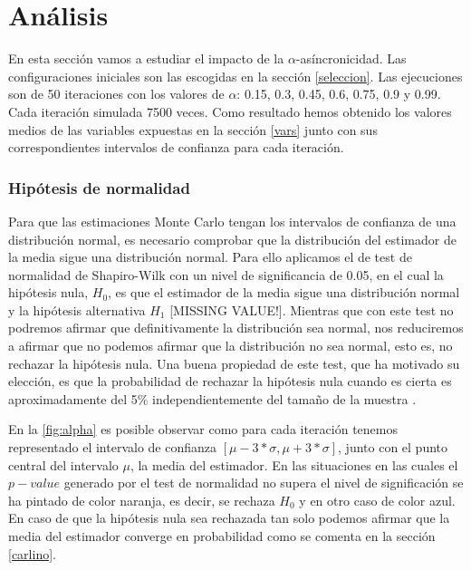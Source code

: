 \documentclass[../proyecto.tex]{memoir}
\begin{document}
\chapter{Análisis}


En esta sección vamos a estudiar el impacto de la $\alpha$-asíncronicidad. Las configuraciones iniciales son las escogidas en la sección \ref{seleccion}. Las ejecuciones son de 50 iteraciones con los valores de $\alpha$: 0.15, 0.3, 0.45, 0.6, 0.75, 0.9 y 0.99. Cada iteración simulada 7500 veces. Como resultado hemos obtenido los valores medios de las variables expuestas en la sección \ref{vars} junto con sus correspondientes intervalos de confianza para cada iteración.

\subsection{Hipótesis de normalidad} \label{normalidad}

Para que las estimaciones Monte Carlo tengan los intervalos de confianza de una distribución normal, es necesario comprobar que la distribución del estimador de la media sigue una distribución normal. Para ello aplicamos el de test de normalidad de Shapiro-Wilk con un nivel de significancia de 0.05, en el cual la hipótesis nula, $H_0$, es que el estimador de la media sigue una distribución normal \cite{shapiro} y la hipótesis alternativa $H_1$ [MISSING VALUE!]. Mientras que con este test no podremos afirmar que definitivamente la distribución sea normal, nos reduciremos a afirmar que no podemos afirmar que la distribución no sea normal, esto es, no rechazar la hipótesis nula. Una buena propiedad de este test, que ha motivado su elección, es que la probabilidad de rechazar la hipótesis nula cuando es cierta es aproximadamente del 5\% independientemente del tamaño de la muestra \cite{powertest}.

En la \autoref{fig:alpha} es posible observar como para cada iteración tenemos representado el intervalo de confianza $[\mu-3*\sigma, \mu+3*\sigma]$, junto con el punto central del intervalo $\mu$, la media del estimador. En las situaciones en las cuales el $p-value$ generado por el test de normalidad no supera el nivel de significación se ha pintado de color naranja, es decir, se rechaza $H_0$ y en otro caso de color azul. En caso de que la hipótesis nula sea rechazada tan solo podemos afirmar que la media del estimador converge en probabilidad como se comenta en la sección \ref{carlino}.
\end{document}
